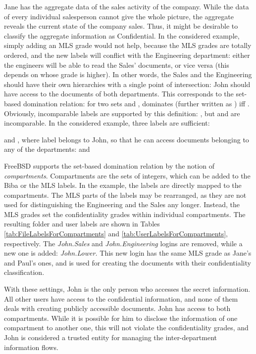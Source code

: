 \documentclass[10pt,a4paper,conference,onecolumn]{IEEEtran}
\newcommand{\KBERcode}[1]{\textsl{#1}}
\begin{document}
Jane has the aggregate data of the sales activity of the company. While
the data of every individual salesperson cannot give the whole picture,
the aggregate reveals the current state of the company sales. Thus, it
might be desirable to classify the aggregate information as Confidential.
In the considered example, simply adding an MLS grade
would not help, because the MLS grades are totally ordered, and
the new labels will conflict with the Engineering department: either the
engineers will be able to read the Sales' documents, or vice versa (this
depends on whose grade is higher). In other words, the Sales
and the Engineering should have their own hierarchies with a single
point of intersection: John should have access to the documents
of both departments. This corresponds to the set-based domination
relation: for two sets  and ,  dominates  (further
written as ) iff . Obviously, incomparable
labels are supported by this definition: ,
but  and  are incomparable.
In the considered example, three labels are sufficient: 
 
and , where label  belongs to John, so that he can access documents
belonging to any of the departments:  and 


FreeBSD supports the set-based domination relation by the notion of
\emph{compartments}. Compartments are the sets of integers, which
can be added to the Biba or the MLS labels. In the example, the labels
are directly mapped to the compartments. The MLS parts of the labels
may be rearranged, as they are not used for distinguishing
the Engineering and the Sales any longer. Instead, the MLS grades
set the confidentiality grades within individual compartments. The
resulting folder and user labels are shown in Tables
\ref{tab:FileLabelsForCompartments} and \ref{tab:UserLabelsForCompartments},
respectively. The \KBERcode{John.Sales} and \KBERcode{John.Engineering}
logins are removed, while a new one is added: \KBERcode{John.Lower.}
This new login has the same MLS grade as Jane's and Paul's ones, and is used
for creating the documents with their confidentiality classification.

With these settings, John is the only person who accesses the secret 
information. All other users have access to the confidential information,
and none of them deals with creating publicly accessible documents. John
has access to both compartments. While it is possible for him to disclose
the information of one compartment to another one, this will not
violate the confidentiality grades, and John is considered a trusted entity
for managing the inter-department information flows.
\end{document}
